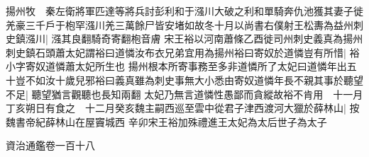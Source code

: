 揚州牧　秦左衛將軍匹達等將兵討彭利和于漒川大破之利和單騎奔仇池獲其妻子徙羌豪三千戶于枹罕漒川羌三萬餘尸皆安堵如故冬十月以尚書右僕射王松夀為益州刺史鎮漒川|{
	漒其良翻騎奇寄翻枹音膚}
宋王裕以河南蕭條乙酉徙司州刺史義真為揚州刺史鎮石頭蕭太妃謂裕曰道憐汝布衣兄弟宜用為揚州裕曰寄奴於道憐豈有所惜|{
	裕小字寄奴道憐蕭太妃所生也}
揚州根本所寄事務至多非道憐所了太妃曰道憐年出五十豈不如汝十歲兒邪裕曰義真雖為刺史事無大小悉由寄奴道憐年長不親其事於聽望不足|{
	聽望猶言觀聽也長知兩翻}
太妃乃無言道憐性愚鄙而貪縱故裕不肯用　十一月丁亥朔日有食之　十二月癸亥魏主嗣西巡至雲中從君子津西渡河大獵於薛林山|{
	按魏書帝紀薛林山在屋竇城西}
辛卯宋王裕加殊禮進王太妃為太后世子為太子

資治通鑑卷一百十八

